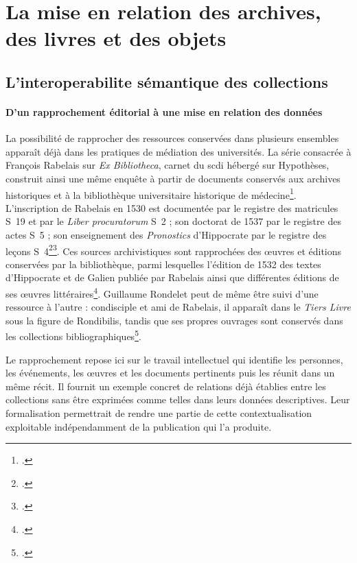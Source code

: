 
\section{La mise en relation des archives, des livres et des objets}

\subsection{L'\gls{interoperabilite} sémantique des collections}

\paragraph{D'un rapprochement éditorial à une mise en relation des données}

La possibilité de rapprocher des ressources conservées dans plusieurs ensembles apparaît déjà dans les pratiques de médiation des universités. La série consacrée à François Rabelais sur \emph{Ex Bibliotheca}, carnet du \gls{scdi} hébergé sur Hypothèses, construit ainsi une même enquête à partir de documents conservés aux archives historiques et à la bibliothèque universitaire historique de médecine\footcite{ExBibliotheca}. L'inscription de Rabelais en 1530 est documentée par le registre des matricules S~19 et par le \emph{Liber procuratorum} S~2 ; son doctorat de 1537 par le registre des actes S~5 ; son enseignement des \emph{Pronostics} d'Hippocrate par le registre des leçons S~4\footcite{LorblanchetRabelais1}\footcite{LorblanchetRabelais2}. Ces sources archivistiques sont rapprochées des œuvres et éditions conservées par la bibliothèque, parmi lesquelles l'édition de 1532 des textes d'Hippocrate et de Galien publiée par Rabelais ainsi que différentes éditions de ses œuvres littéraires\footcite{LorblanchetRabelais4}. Guillaume Rondelet peut de même être suivi d'une ressource à l'autre : condisciple et ami de Rabelais, il apparaît dans le \emph{Tiers Livre} sous la figure de Rondibilis, tandis que ses propres ouvrages sont conservés dans les collections bibliographiques\footcite{LorblanchetRabelais3}.

Le rapprochement repose ici sur le travail intellectuel qui identifie les personnes, les événements, les œuvres et les documents pertinents puis les réunit dans un même récit. Il fournit un exemple concret de relations déjà établies entre les collections sans être exprimées comme telles dans leurs données descriptives. Leur formalisation permettrait de rendre une partie de cette contextualisation exploitable indépendamment de la publication qui l'a produite.


